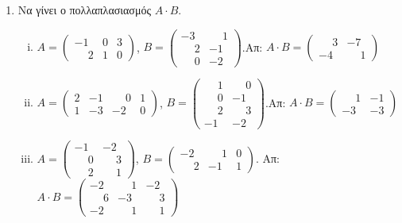 \documentclass[a4paper,12pt]{article}
\begin{document}
\thispagestyle{empty}

\begin{center}
\end{center}

\vspace{\baselineskip}


\begin{enumerate}

\item Να γίνει ο πολλαπλασιασμός $Α\cdot B$.

\begin{enumerate}[i)]

\item $A=\begin{pmatrix}
-1 & 0 & 3 \\
\phantom{-}2 & 1 & 0 
\end{pmatrix}$,
\quad
$Β=\begin{pmatrix}
-3 & \phantom{-}1 \\
\phantom{-}2 & -1 \\ 
\phantom{-}0 & -2
\end{pmatrix}$.\hfill Απ: $Α\cdot B = \begin{pmatrix}
\phantom{-}3 & -7 \\
-4 & \phantom{-}1
\end{pmatrix}$

\item $A=\begin{pmatrix}
2 & -1 & \phantom{-}0 & 1 \\
1 & -3 & -2 & 0
\end{pmatrix}$,
\quad
$Β=\begin{pmatrix}
\phantom{-}1 & \phantom{-}0 \\
\phantom{-}0 & -1 \\
\phantom{-}2 & \phantom{-}3 \\
-1 & -2 
\end{pmatrix}$.\hfill Απ: $A\cdot B=\begin{pmatrix}
\phantom{-}1 & -1 \\
-3 & -3 
\end{pmatrix}$

\item $A=\begin{pmatrix}
-1 & -2 \\
\phantom{-}0 & \phantom{-}3 \\
\phantom{-}2 & \phantom{-}1 
\end{pmatrix}$,
\quad 
$B=\begin{pmatrix}
-2 & \phantom{-}1 & 0 \\
\phantom{-}2 & -1 & 1 
\end{pmatrix}$. \hfill Απ: $A\cdot B=\begin{pmatrix}
-2 & \phantom{-}1 & -2 \\
\phantom{-}6 & -3 & \phantom{-}3 \\
-2 & \phantom{-}1 & \phantom{-}1 
\end{pmatrix}$

\end{enumerate}


\end{enumerate}
\end{document}
